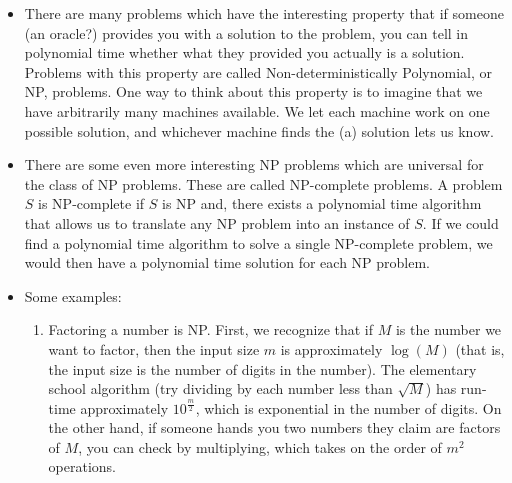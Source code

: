 \documentclass{article}
\def\pagedone{\newpage}
\begin{document}
\begin{itemize}
	\item There are many problems which have the interesting property that if someone (an oracle?) provides you with a solution to the problem, you can tell in polynomial time whether what they provided you actually is a solution.  Problems with this property are called Non-deterministically Polynomial, or NP, problems.  One way to think about this property is to imagine that we have arbitrarily many machines available.  We let each machine work on one possible solution, and whichever machine finds the (a) solution lets us know.
	\item There are some even more interesting NP problems which are universal for the class of NP problems.  These are called NP-complete problems.  A problem $S$ is NP-complete if $S$ is NP and, there exists a polynomial time algorithm that allows us to translate any NP problem into an instance of $S$.  If we could find a polynomial time algorithm to solve a single NP-complete problem, we would then have a polynomial time solution for each NP problem.
\pagedone
	\item Some examples:
	
	\begin{enumerate}
		\item Factoring a number is NP.  First, we recognize that if $M$ is the number we want to factor, then the input size $m$ is approximately $\log(M)$ (that is, the input size is the number of digits in the number).  The elementary school algorithm (try dividing by each number less than $\sqrt M$) has run-time approximately $10^{\frac{m}{2}}$, which is exponential in the number of digits.  On the other hand, if someone hands you two numbers they claim are factors of $M$, you can check by multiplying, which takes on the order of $m^2$ operations.


\end{enumerate}
\end{itemize}
\end{document}
